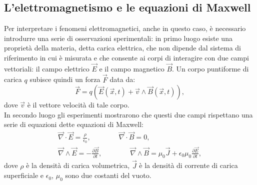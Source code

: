 \subsection{L'elettromagnetismo e le equazioni di Maxwell}\label{sec:EquazioniMaxwell}
Per interpretare i fenomeni elettromagnetici, anche in questo caso, è necessario introdurre
una serie di osservazioni sperimentali: in primo luogo esiste una proprietà della materia, 
detta carica elettrica, che non dipende dal sistema di riferimento in cui è misurata e che consente 
ai corpi di interagire con due campi vettoriali: 
il campo elettrico $\vec{E}$ e il campo magnetico $\vec{B}$. Un corpo puntiforme di carica 
$q$ subisce quindi un forza $\vec{F}$ data da:
\begin{equation}
	\vec{F}=q(\vec{E}(\vec{x},t)+\vec{v}\wedge\vec{B}(\vec{x},t)),
	\label{ForzaLorentz}
\end{equation}
dove $\vec{v}$ è il vettore velocità di tale corpo.\\
In secondo luogo gli esperimenti mostrarono che questi due campi rispettano una serie di equazioni 
dette equazioni di Maxwell:
\begin{equation}
	\begin{gathered}
		\vec{\nabla}\cdot\vec{E}=\frac{\rho}{\epsilon_0}, \qquad \qquad \vec{\nabla}\cdot\vec{B}=0, \\
		\vec{\nabla}\wedge\vec{E}=-\frac{\partial\vec{B}}{\partial t}, \qquad \qquad \vec{\nabla}\wedge
		\vec{B}=\mu_0\vec{J}+\epsilon_0\mu_0\frac{\partial\vec{E}}{\partial t},
		\label{EquazioniMaxwell}
	\end{gathered}
\end{equation}
dove $\rho$ è la densità di carica volumetrica, $\vec{J}$ è la densità di corrente di carica superficiale e 
$\epsilon_0$, $\mu_0$ sono due costanti del vuoto.\\

